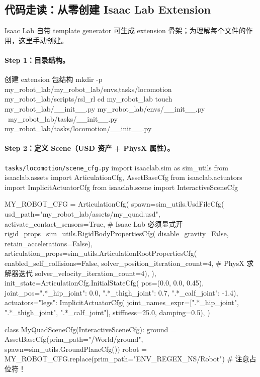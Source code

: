 \subsection{代码走读：从零创建 Isaac Lab Extension}
\label{sec:rlmc-diy-isaac-create}

Isaac Lab 自带 template generator 可生成 extension 骨架；为理解每个文件的作用，这里手动创建。

\paragraph{Step 1：目录结构。}

\begin{codebox}[bash]{创建 extension 包结构}
mkdir -p my_robot_lab/my_robot_lab/{envs,tasks/locomotion} my_robot_lab/scripts/rsl_rl
cd my_robot_lab
touch my_robot_lab/__init__.py my_robot_lab/envs/__init__.py \
      my_robot_lab/tasks/__init__.py my_robot_lab/tasks/locomotion/__init__.py
\end{codebox}

\paragraph{Step 2：定义 Scene（USD 资产 + PhysX 属性）。}

\begin{codebox}[Python]{\texttt{tasks/\allowbreak locomotion/\allowbreak scene\_cfg.\allowbreak py}}
import isaaclab.sim as sim_utils
from isaaclab.assets import ArticulationCfg, AssetBaseCfg
from isaaclab.actuators import ImplicitActuatorCfg
from isaaclab.scene import InteractiveSceneCfg

MY_ROBOT_CFG = ArticulationCfg(
    spawn=sim_utils.UsdFileCfg(
        usd_path="my_robot_lab/assets/my_quad.usd",
        activate_contact_sensors=True,                # Isaac Lab 必须显式开
        rigid_props=sim_utils.RigidBodyPropertiesCfg(
            disable_gravity=False, retain_accelerations=False),
        articulation_props=sim_utils.ArticulationRootPropertiesCfg(
            enabled_self_collisions=False,
            solver_position_iteration_count=4,        # PhysX 求解器迭代
            solver_velocity_iteration_count=4),
    ),
    init_state=ArticulationCfg.InitialStateCfg(
        pos=(0.0, 0.0, 0.45),
        joint_pos={".*_hip_joint": 0.0, ".*_thigh_joint": 0.7, ".*_calf_joint": -1.4}),
    actuators={"legs": ImplicitActuatorCfg(
        joint_names_expr=[".*_hip_joint", ".*_thigh_joint", ".*_calf_joint"],
        stiffness=25.0, damping=0.5)},
)

class MyQuadSceneCfg(InteractiveSceneCfg):
    ground = AssetBaseCfg(prim_path="/World/ground", spawn=sim_utils.GroundPlaneCfg())
    robot  = MY_ROBOT_CFG.replace(prim_path="{ENV_REGEX_NS}/Robot")  # 注意占位符！
\end{codebox}


